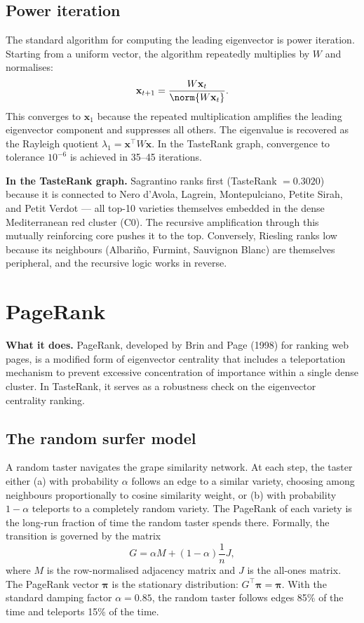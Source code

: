 \documentclass[11pt]{article}
\begin{document}
\subsection{Power iteration}
The standard algorithm for computing the leading eigenvector is power iteration. Starting from a uniform vector, the algorithm repeatedly multiplies by $W$ and normalises:
\[
\mathbf{x}_{t+1} = \frac{W \mathbf{x}_t}{\norm{W \mathbf{x}_t}}.
\]
This converges to $\mathbf{x}_1$ because the repeated multiplication amplifies the leading eigenvector component and suppresses all others. The eigenvalue is recovered as the Rayleigh quotient $\lambda_1 = \mathbf{x}^\top W \mathbf{x}$. In the TasteRank graph, convergence to tolerance $10^{-6}$ is achieved in 35--45 iterations.

\textbf{In the TasteRank graph.} Sagrantino ranks first (TasteRank $= 0.3020$) because it is connected to Nero d'Avola, Lagrein, Montepulciano, Petite Sirah, and Petit Verdot --- all top-10 varieties themselves embedded in the dense Mediterranean red cluster (C0). The recursive amplification through this mutually reinforcing core pushes it to the top. Conversely, Riesling ranks low because its neighbours (Albari\~no, Furmint, Sauvignon Blanc) are themselves peripheral, and the recursive logic works in reverse.

\section{PageRank}

\textbf{What it does.} PageRank, developed by Brin and Page (1998) for ranking web pages, is a modified form of eigenvector centrality that includes a teleportation mechanism to prevent excessive concentration of importance within a single dense cluster. In TasteRank, it serves as a robustness check on the eigenvector centrality ranking.

\subsection{The random surfer model}
A random taster navigates the grape similarity network. At each step, the taster either (a) with probability $\alpha$ follows an edge to a similar variety, choosing among neighbours proportionally to cosine similarity weight, or (b) with probability $1 - \alpha$ teleports to a completely random variety. The PageRank of each variety is the long-run fraction of time the random taster spends there. Formally, the transition is governed by the matrix
\[
G = \alpha M + (1 - \alpha) \frac{1}{n} J,
\]
where $M$ is the row-normalised adjacency matrix and $J$ is the all-ones matrix. The PageRank vector $\boldsymbol\pi$ is the stationary distribution: $G^\top \boldsymbol\pi = \boldsymbol\pi$. With the standard damping factor $\alpha = 0.85$, the random taster follows edges 85\% of the time and teleports 15\% of the time.
\end{document}
